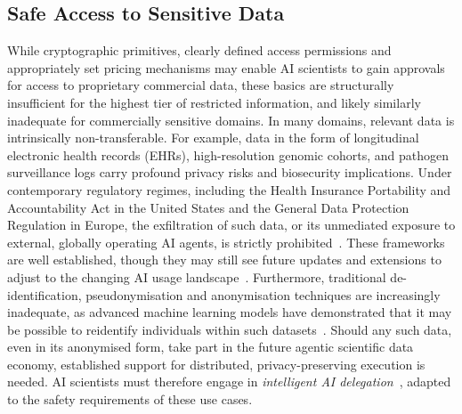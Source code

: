 \documentclass[11pt, a4paper, twocolumn, goog]{google}
\begin{document}
\subsection{Safe Access to Sensitive Data}

While cryptographic primitives, clearly defined access permissions and appropriately set pricing mechanisms may enable AI scientists to gain approvals for access to proprietary commercial data, these basics are structurally insufficient for the highest tier of restricted information, and likely similarly inadequate for commercially sensitive domains. In many domains, relevant data is intrinsically non-transferable. For example, data in the form of longitudinal electronic health records (EHRs), high-resolution genomic cohorts, and pathogen surveillance logs carry profound privacy risks and biosecurity implications. Under contemporary regulatory regimes, including the Health Insurance Portability and Accountability Act in the United States and the General Data Protection Regulation in Europe, the exfiltration of such data, or its unmediated exposure to external, globally operating AI agents, is strictly prohibited~\citep{price2019privacy, rajpurkar2022ai}. These frameworks are well established, though they may still see future updates and extensions to adjust to the changing AI usage landscape~\citep{marks2023ai}. Furthermore, traditional de-identification, pseudonymisation and anonymisation techniques are increasingly inadequate, as advanced machine learning models have demonstrated that it may be possible to reidentify individuals within such datasets~\citep{rocher2019estimating, bonomi2020privacy}. Should any such data, even in its anonymised form, take part in the future agentic scientific data economy, established support for distributed, privacy-preserving execution is needed. AI scientists must therefore engage in \emph{intelligent AI delegation}~\citep{tomasev2026intelligentaidelegation}, adapted to the safety requirements of these use cases.
\end{document}
